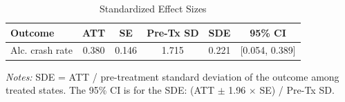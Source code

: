 \begin{table}[t]
\centering
\caption{Standardized Effect Sizes}
\label{tab:sde}
\begin{tabular}{lccccc}
\toprule
Outcome & ATT & SE & Pre-Tx SD & SDE & 95\% CI \\
\midrule
Alc. crash rate & 0.380 & 0.146 & 1.715 & 0.221 & [0.054, 0.389] \\
\bottomrule
\end{tabular}
\begin{tablenotes}
\small
\item \textit{Notes:} SDE = ATT / pre-treatment standard deviation of the outcome among treated states. The 95\% CI is for the SDE: (ATT $\pm$ 1.96 $\times$ SE) / Pre-Tx SD.
\end{tablenotes}
\end{table}
